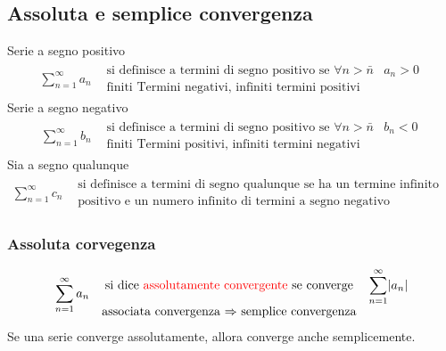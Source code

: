 \documentclass{book}
\newcommand{\abs}[1]{\lvert#1\rvert}
\begin{document}
\subsection{Assoluta e semplice convergenza}
Serie a segno positivo
\begin{equation*}
	\begin{matrix}
		\displaystyle\sum_{n=1}^{\infty} a_n& \begin{matrix}
			\text{si definisce a termini di segno positivo se } \forall n>
			\bar{n} &a_n>0\\
			\text{finiti Termini negativi, infiniti termini positivi}
		\end{matrix}
	\end{matrix}
\end{equation*}
Serie a segno negativo
\begin{equation*}
	\begin{matrix}
		\displaystyle\sum_{n=1}^{\infty} b_n& \begin{matrix}
			\text{si definisce a termini di segno positivo se } \forall n>
			\bar{n} &b_n<0\\
			\text{finiti Termini positivi, infiniti termini negativi}
		\end{matrix}
	\end{matrix}
\end{equation*}
Sia a segno qualunque
\begin{equation*}
	\begin{matrix}
		\displaystyle\sum_{n=1}^{\infty} c_n& \begin{matrix}
			\text{si definisce a termini di segno qualunque se ha un termine
			infinito di termini a segno}\\
			\text{positivo e un numero infinito di termini a segno negativo}
		\end{matrix}
	\end{matrix}
\end{equation*}
\subsubsection{Assoluta corvegenza}
\begin{equation*}
	\begin{matrix}
		\displaystyle\sum_{n=1}^{\infty} a_n& \begin{matrix}
			\text{si dice {\color{red}assolutamente convergente} se converge} &
			\displaystyle\sum_{n=1}^{\infty} \abs{a_n}\\
			\text{associata convergenza $\Rightarrow$ semplice convergenza} 
		\end{matrix}
	\end{matrix}
\end{equation*}
Se una serie converge assolutamente, allora converge anche semplicemente.
\end{document}
